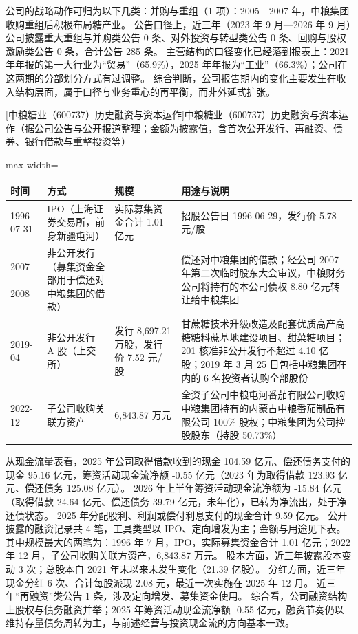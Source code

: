  公司的战略动作可归为以下几类：并购与重组（1 项）：2005---2007 年，中粮集团收购重组后积极布局糖产业。 公告口径上，近三年（2023 年 9 月---2026 年 9 月）公司披露重大重组与并购类公告 0 条、对外投资与转型类公告 0 条、回购与股权激励类公告 0 条，合计公告 285 条。 主营结构的口径变化已经落到报表上：2021 年年报的第一大行业为“贸易”（65.9\%），2025 年年报为“工业”（66.3\%）；公司在这两期的分部划分方式有过调整。 综合判断，公司报告期内的变化主要发生在收入结构层面，属于口径与业务重心的再平衡，而非外延式扩张。

\begin{center}\small\setlength{\tabcolsep}{4pt}
[中粮糖业（600737）历史融资与资本运作]{中粮糖业（600737）历史融资与资本运作（据公司公告与公开报道整理；金额为披露值，含首次公开发行、再融资、债券、银行借款与重整投资等）}
\begin{adjustbox}{max width=\textwidth}
\begin{tabular}{@{}p{1.45cm}p{2.55cm}p{4.05cm}p{4.95cm}@{}}
\toprule
时间 & 方式 & 规模 & 用途与说明 \\
\midrule
1996-07-31 & IPO（上海证券交易所，前身新疆屯河） & 实际募集资金合计 1.01 亿元 & 招股公告日 1996-06-29，\allowbreak{}发行价 5.78 元/\allowbreak{}股 \\
2007—2008 & 非公开发行（募集资金全部用于偿还对中粮集团的借款） & --- & 偿还对中粮集团的借款；经公司 2007 年第二次临时股东大会审议，\allowbreak{}中粮财务公司将持有的本公司债权 8.80 亿元转让给中粮集团 \\
2019-04 & 非公开发行 A 股（上交所） & 发行 8,\allowbreak{}697.21 万股，\allowbreak{}发行价 7.52 元/\allowbreak{}股 & 甘蔗糖技术升级改造及配套优质高产高糖糖料蔗基地建设项目、\allowbreak{}甜菜糖项目；201 核准非公开发行不超过 4.10 亿股；2019 年 3 月 25 日包括中粮集团在内的 6 名投资者认购全部股份 \\
2022-12 & 子公司收购关联方资产 & 6,\allowbreak{}843.87 万元 & 全资子公司中粮屯河番茄有限公司收购中粮集团持有的内蒙古中粮番茄制品有限公司 100\% 股权；中粮集团为公司控股股东（持股 50.73\%） \\
\bottomrule
\end{tabular}
\end{adjustbox}
\end{center}

 从现金流量表看，2025 年公司取得借款收到的现金 104.59 亿元、偿还债务支付的现金 95.16 亿元，筹资活动现金流净额 -0.55 亿元（2023 年为取得借款 123.93 亿元、偿还债务 125.08 亿元）。 2026 年上半年筹资活动现金流净额为 -15.84 亿元（取得借款 24.64 亿元、偿还债务 39.79 亿元，未年化），已转为净流出，处于净还债状态。 2025 年分配股利、利润或偿付利息支付的现金合计 9.59 亿元。 公开披露的融资记录共 4 笔，工具类型以 IPO、定向增发为主；金额与用途见下表。 其中规模最大的两笔为：1996 年 7 月，IPO，实际募集资金合计 1.01 亿元；2022 年 12 月，子公司收购关联方资产，6,843.87 万元。 股本方面，近三年披露股本变动 3 次；总股本自 2021 年末以来未发生变化（21.39 亿股）。 分红方面，近三年现金分红 6 次、合计每股派现 2.08 元，最近一次实施在 2025 年 12 月。 近三年“再融资”类公告 1 条，涉及定向增发、募集资金使用。 综合看，公司融资结构上股权与债务融资并举；2025 年筹资活动现金流净额 -0.55 亿元，融资节奏仍以维持存量债务周转为主，与前述经营与投资现金流的方向基本一致。

